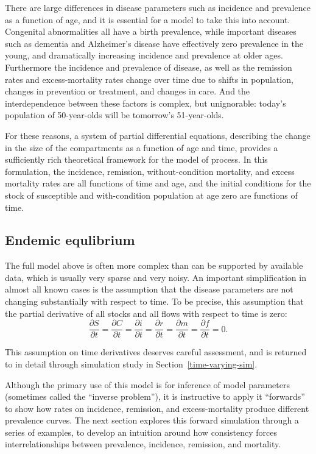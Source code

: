 There are large differences in disease parameters such as incidence
and prevalence as a function of age, and it is essential for a model
to take this into account.  Congenital abnormalities all have a birth
prevalence, while important diseases such as dementia and Alzheimer's
disease have effectively zero prevalence in the young, and
dramatically increasing incidence and prevalence at older
ages. Furthermore the incidence and prevalence of disease, as well as
the remission rates and excess-mortality rates change over time due to
shifts in population, changes in prevention or treatment, and changes
in care. And the interdependence between these factors is complex, but
unignorable: today's population of 50-year-olds will be tomorrow's
51-year-olds.

For these reasons, a system of partial differential equations,
describing the change in the size of the compartments as a function of
age and time, provides a sufficiently rich theoretical framework for
the model of process.  In this formulation, the incidence, remission,
without-condition mortality, and excess mortality rates are all
functions of time and age, and the initial conditions for the stock of
susceptible and with-condition population at age zero are functions of
time.

\subsection{Endemic equlibrium}
\label{theory-forward_sim-compartmental_model-simplying_assumptions}

The full model above is often more complex than can be supported by
available data, which is usually very sparse and very noisy.  An
important simplification in almost all known cases is the assumption
that the disease parameters are not changing substantially with
respect to time. To be precise, this assumption that the partial
derivative of all stocks and all flows with respect to time is zero:
\[
\frac{\partial S}{\partial t}
=
\frac{\partial C}{\partial t}
=
\frac{\partial i}{\partial t}
=
\frac{\partial r}{\partial t}
=
\frac{\partial m}{\partial t}
=
\frac{\partial f}{\partial t}
=
0.
\]

This assumption on time derivatives deserves careful assessment, and
is returned to in detail through simulation study in
Section~\ref{time-varying-sim}.

Although the primary use of this model is for inference of model
parameters (sometimes called the ``inverse problem''), it is
instructive to apply it ``forwards'' to show how rates on incidence,
remission, and excess-mortality produce different prevalence
curves. The next section explores this forward simulation through a
series of examples, to develop an intuition around how consistency
forces interrelationships between prevalence, incidence, remission,
and mortality.


